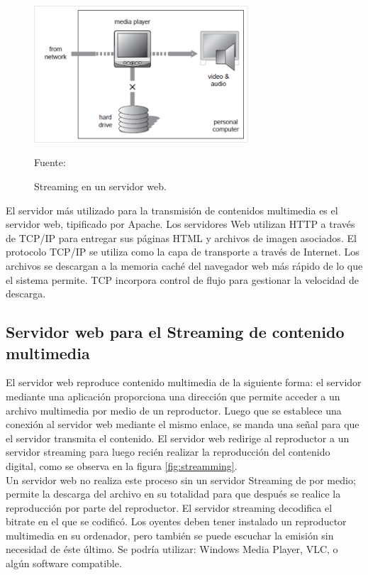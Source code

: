 \begin{figure}[H]
    \begin{center}
        \includegraphics[width=8cm]{img/capitulo_2/stream.png}
        \caption{Streaming en un servidor web.\\}
        Fuente: \cite{streamming:austerberry}
        \label{fig:stream}
    \end{center}
\end{figure}

El servidor más utilizado para la transmisión de contenidos multimedia es el servidor web, tipificado por Apache. Los servidores Web utilizan HTTP a través de TCP/IP para entregar sus páginas HTML y archivos de imagen asociados. El protocolo TCP/IP se utiliza como la capa de transporte a través de Internet. Los archivos se descargan a la memoria caché del navegador web más rápido de lo que el sistema permite. TCP incorpora control de flujo para gestionar la velocidad de descarga.\\
\subsection{Servidor web para el Streaming de contenido multimedia}

El servidor web reproduce contenido multimedia de la siguiente forma: el servidor mediante una aplicación proporciona una dirección que permite acceder a un archivo multimedia por medio de un reproductor. Luego que se establece una conexión al servidor web mediante el mismo enlace, se manda una señal para que el servidor transmita el contenido. El servidor web redirige al reproductor a un servidor streaming para luego recién realizar la reproducción del contenido digital, como se observa en la figura \ref{fig:streamming}.\\

Un servidor web no realiza este proceso sin un servidor Streaming de por medio; permite la descarga del archivo en su totalidad para que después se realice la reproducción por parte del reproductor. El servidor streaming decodifica el bitrate en el que se codificó. Los oyentes deben tener instalado un reproductor multimedia en su ordenador, pero también se puede escuchar la emisión sin necesidad de éste último. Se podría utilizar: Windows Media Player, VLC, o algún software compatible.\\

